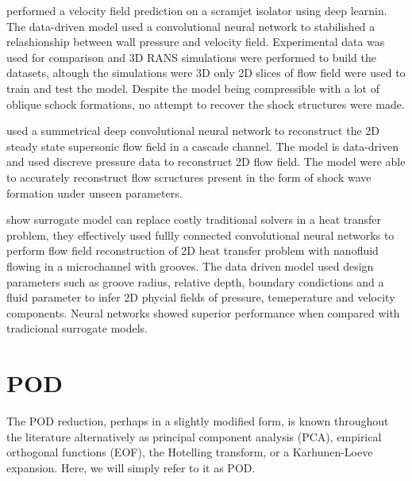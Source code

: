 \cite{kongDeep2021} performed a velocity field prediction on a scramjet isolator using deep learnin. The data-driven model used a convolutional neural network to stabilished a relashionship between wall pressure and velocity field. Experimental data was used for comparison and 3D RANS simulations were performed to build the datasets, altough the simulations were 3D only 2D slices of flow field were used to train and test the model. Despite the model being compressible with a lot of oblique schock formations, no attempt to recover the shock structures were made.

\cite{liFlow2020} used a summetrical deep convolutional neural network to reconstruct the 2D steady state supersonic flow field in a cascade channel. The model is data-driven and used discreve pressure data to  reconstruct 2D flow field. The model were able to accurately reconstruct flow scructures present in the form of shock wave formation under unseen parameters.

\cite{liuSupervised2021} show surrogate model can replace costly traditional solvers in a heat transfer problem, they effectively used fullly connected convolutional neural networks to perform
flow field reconstruction of 2D heat transfer problem with nanofluid flowing in a microchannel with grooves. The data driven model used design parameters such as groove radius, relative depth, boundary condictions and a fluid parameter to infer 2D phycial fields of pressure, temeperature and velocity components. Neural networks showed superior performance when compared with tradicional surrogate models.

\section{POD}

The POD reduction, perhaps in a slightly modified form, is known throughout the literature alternatively as principal component analysis (PCA), empirical orthogonal functions (EOF), the Hotelling transform, or a Karhunen-Loeve expansion. Here, we will simply refer to it as POD.


